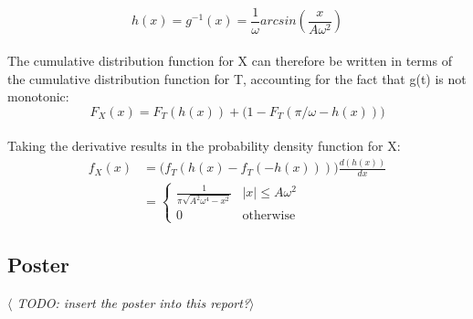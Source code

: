 \documentclass[12pt]{article}
\begin{document}
\begin{appendix}
    \begin{equation}
      h(x) = g^{-1}(x) = \frac{1}{\omega} arcsin \left(\frac{x}{A\omega^2}\right)
    \end{equation}
    \\
    The cumulative distribution function for X can therefore be written in terms of the cumulative distribution function for T, accounting for the fact that g(t) is not monotonic:
    \begin{equation}
      F_X(x) = F_T(h(x)) + \Big(1 - F_T(\pi/\omega - h(x))\Big)
    \end{equation}
    \\
    Taking the derivative results in the probability density function for X:
    \begin{align}
      f_X(x) & = \Big(f_T(h(x) - f_T(-h(x)))\Big) \frac{d(h(x))}{dx}\\
      & =
      \begin{cases}
        \frac{1}{\pi \sqrt{A^2 \omega^4 - x^2}} & |x| \leq A \omega^2\\
        0 & \text{otherwise}
      \end{cases}
    \end{align}


    \subsection{Poster}
      \textit{$\langle$ TODO: insert the poster into this report?$\rangle$}

\end{appendix}
\end{document}
